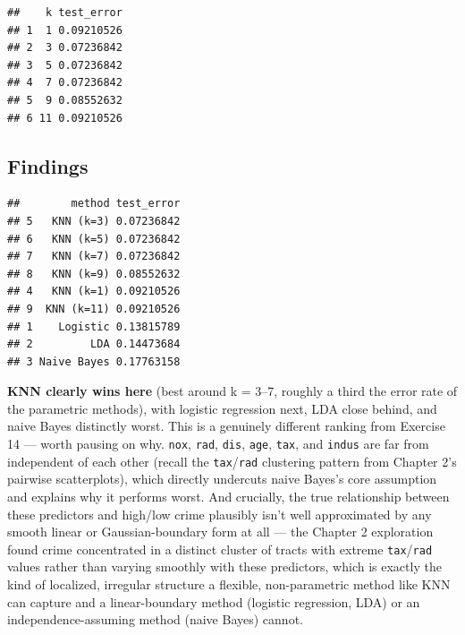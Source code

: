 \documentclass[
  11pt,
]{article}
\newenvironment{Shaded}{\begin{snugshade}}{\end{snugshade}}
\newcommand{\AttributeTok}[1]{\textcolor[rgb]{0.13,0.29,0.53}{#1}}
\newcommand{\FunctionTok}[1]{\textcolor[rgb]{0.13,0.29,0.53}{\textbf{#1}}}
\newcommand{\NormalTok}[1]{#1}
\newcommand{\OtherTok}[1]{\textcolor[rgb]{0.56,0.35,0.01}{#1}}
\newcommand{\SpecialCharTok}[1]{\textcolor[rgb]{0.81,0.36,0.00}{\textbf{#1}}}
\newcommand{\StringTok}[1]{\textcolor[rgb]{0.31,0.60,0.02}{#1}}
\begin{document}
\begin{verbatim}
##    k test_error
## 1  1 0.09210526
## 2  3 0.07236842
## 3  5 0.07236842
## 4  7 0.07236842
## 5  9 0.08552632
## 6 11 0.09210526
\end{verbatim}

\subsection{Findings}\label{findings}

\begin{Shaded}
\end{Shaded}

\begin{verbatim}
##        method test_error
## 5   KNN (k=3) 0.07236842
## 6   KNN (k=5) 0.07236842
## 7   KNN (k=7) 0.07236842
## 8   KNN (k=9) 0.08552632
## 4   KNN (k=1) 0.09210526
## 9  KNN (k=11) 0.09210526
## 1    Logistic 0.13815789
## 2         LDA 0.14473684
## 3 Naive Bayes 0.17763158
\end{verbatim}

\textbf{KNN clearly wins here} (best around k = 3--7, roughly a third
the error rate of the parametric methods), with logistic regression
next, LDA close behind, and naive Bayes distinctly worst. This is a
genuinely different ranking from Exercise 14 --- worth pausing on why.
\texttt{nox}, \texttt{rad}, \texttt{dis}, \texttt{age}, \texttt{tax},
and \texttt{indus} are far from independent of each other (recall the
\texttt{tax}/\texttt{rad} clustering pattern from Chapter 2's pairwise
scatterplots), which directly undercuts naive Bayes's core assumption
and explains why it performs worst. And crucially, the true relationship
between these predictors and high/low crime plausibly isn't well
approximated by any smooth linear or Gaussian-boundary form at all ---
the Chapter 2 exploration found crime concentrated in a distinct cluster
of tracts with extreme \texttt{tax}/\texttt{rad} values rather than
varying smoothly with these predictors, which is exactly the kind of
localized, irregular structure a flexible, non-parametric method like
KNN can capture and a linear-boundary method (logistic regression, LDA)
or an independence-assuming method (naive Bayes) cannot.
\end{document}
